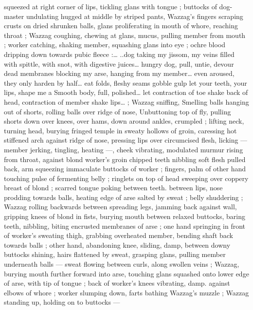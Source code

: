 squeezed at right corner of lips, tickling glans with tongue ; buttocks 
of dog-master undulating hugged at middle by striped pants, 
Wazzag's fingers scraping crusts on dried shrunken balls, glans 
proliferating in mouth of whore, reaching throat ; Wazzag coughing, 
chewing at glans, mucus, pulling member from mouth ; worker 
catching, shaking member, squashing glans into eye ; ochre blood 
dripping down towards pubic fleece :{\ldots} {\gl}..dog taking my jissom, my 
veins filled with spittle, with snot, with digestive juices{\ldots} hungry dog, 
pull, untie, devour dead membranes blocking my arse, hanging from 
my member{\ldots} even aroused, they only harden by half{\ldots} eat folds, 
fleshy seams{\td} gobble{\td} gulp{\td} let your teeth, your lips, shape me a 
Smooth body, full, polished{\ldots} let contraction of toe shake back of 
head, contraction of member shake lips{\ldots}{\gr} ; Wazzag sniffing, 
Smelling balls hanging out of shorts, rolling balls over ridge of nose, 
Unbuttoning top of fly, pulling shorts down over knees, over hams, 
down around ankles, crumpled ; lifting neck, turning head, burying 
fringed temple in sweaty hollows of groin, caressing hot stiffened 
arch against ridge of nose, pressing lips over circumcised flesh, 
licking --- member jerking, tingling, heating ---, cheek vibrating, 
modulated murmur rising from throat, against blond worker's groin 
chipped teeth nibbling soft flesh pulled back, arm squeezing 
immaculate buttocks of worker ; fingers, palm of other hand touching 
pulse of fermenting belly ; ringlets on top of head sweeping over 
coppery breast of blond ; scarred tongue poking between teeth. 
between lips, nose prodding towards balls, heating edge of arse 
salted by sweat ; belly shuddering ; Wazzag rolling backwards 
between spreading legs, jamming back against wall, gripping knees 
of blond in fists, burying mouth between relaxed buttocks, baring 
teeth, nibbling, biting encrusted membranes of arse ; one hand 
springing in front of worker's sweating thigh, grabbing overheated 
member, bending shaft back towards balls ; other hand, abandoning 
knee, sliding, damp, between downy buttocks shining, hairs flattened 
by sweat, grasping glans, pulling member underneath balls --- sweat 
flowing between curls, along swollen veins ; Wazzag, burying mouth 
further forward into arse, touching glans squashed onto lower edge 
of arse, with tip of tongue ; back of worker's knees vibrating, damp. 
against elbows of whore ; worker slumping down, farts bathing 
Wazzag's muzzle ; Wazzag standing up, holding on to buttocks --- 
